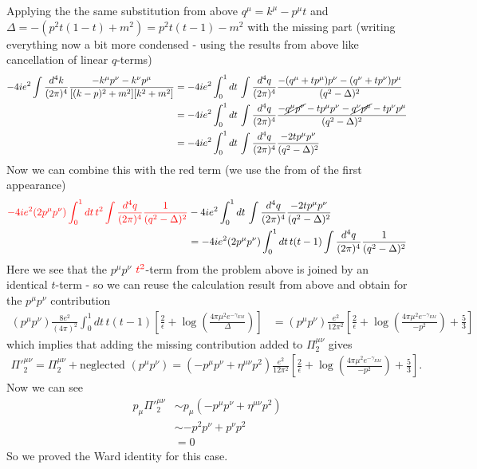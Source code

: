 \documentclass[10pt,a4paper]{article}
\theoremstyle{definition}
\begin{document}
Applying the the same substitution from above $q^\mu=k^\mu-p^\mu t$ and $\Delta=-(p^2t(1-t)+m^2)=p^2t(t-1)-m^2$ with the missing part (writing everything now a bit more condensed - using the results from above like cancellation of linear $q$-terms)
\begin{align}
-4ie^2\int\frac{d^4k}{(2\pi)^4}\frac{-k^\mu p^\nu-k^\nu p^\mu}{[(k-p)^2+m^2][k^2+m^2]}
&=-4ie^2\int_0^1 dt\,\int\frac{d^4q}{(2\pi)^4}\frac{-(q^\mu+t p^\mu) p^\nu-(q^\nu+t p^\nu) p^\mu}{(q^2-\Delta)^2}\\
&=-4ie^2\int_0^1 dt\,\int\frac{d^4q}{(2\pi)^4}\frac{-\cancel{q^\mu p^\nu}-t p^\mu p^\nu-\cancel{q^\nu p^\mu}-t p^\nu p^\mu}{(q^2-\Delta)^2}\\
&=-4ie^2\int_0^1 dt\,\int\frac{d^4q}{(2\pi)^4}\frac{-2t p^\mu p^\nu}{(q^2-\Delta)^2}
\end{align}
Now we can combine this with the red term (we use the from of the first appearance)
\begin{align}
\textcolor{red}{-4ie^2(2p^\mu p^\nu)\int_0^1 dt\, t^2\int\frac{d^4q}{(2\pi)^4} \frac{1}{(q^2-\Delta)^2}}&-4ie^2\int_0^1 dt\,\int\frac{d^4q}{(2\pi)^4}\frac{-2t p^\mu p^\nu}{(q^2-\Delta)^2}\\
&=-4ie^2(2p^\mu p^\nu)\int_0^1 dt\,t(t-1)\int\frac{d^4q}{(2\pi)^4} \frac{1}{(q^2-\Delta)^2}
\end{align}
Here we see that the $p^\mu p^\nu$ $\textcolor{red}{t^2}$-term from the problem above is joined by an identical $t$-term - so we can reuse the calculation result from above and obtain for the $p^\mu p^\nu$ contribution
\begin{align}
(p^\mu p^\nu)\frac{8e^2}{(4\pi)^2}\int_0^1dt\,t(t-1)\left[\frac{2}{\epsilon }+\log\left(\frac{4\pi\mu^2e^{-\gamma_{EM}}}{\Delta}\right)\right]
&=(p^\mu p^\nu)\frac{e^2}{12\pi^2}\left[\frac{2}{\epsilon}+\log\left(\frac{4\pi\mu^2e^{-\gamma_{EM}}}{-p^2}\right)+\frac{5}{3}\right]
\end{align}
which implies that adding the missing contribution added to $\Pi^{\mu\nu}_2$ gives
\begin{align}
\Pi'^{\mu\nu}_2=\Pi^{\mu\nu}_2+\text{neglected }(p^\mu p^\nu)=(-p^\mu p^\nu+\eta^{\mu\nu}p^2)\frac{e^2}{12\pi^2}\left[\frac{2}{\epsilon}+\log\left(\frac{4\pi\mu^2e^{-\gamma_{EM}}}{-p^2}\right)+\frac{5}{3}\right].
\end{align}
Now we can see
\begin{align}
p_\mu\Pi'^{\mu\nu}_2&\sim p_\mu(-p^\mu p^\nu+\eta^{\mu\nu}p^2)\\
&\sim -p^2p^\nu+p^\nu p^2\\
&=0
\end{align}
So we proved the Ward identity for this case.
\newpage
\end{document}
